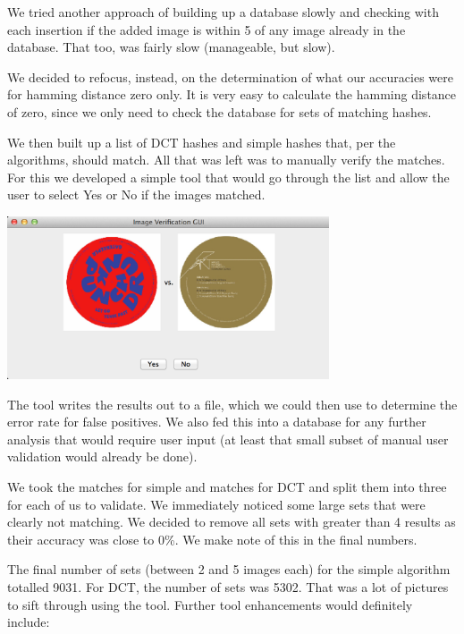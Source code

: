 \documentclass[11pt,a4paper,titlepage]{article}
\begin{document}
We tried another approach of building up a database slowly and checking with
each insertion if the added image is within 5 of any image already in the
database.  That too, was fairly slow (manageable, but slow).

We decided to refocus, instead, on the determination of what our accuracies
were for hamming distance zero only.  It is very easy to calculate the hamming
distance of zero, since we only need to check the database for sets of matching
hashes.

We then built up a list of DCT hashes and simple hashes that, per the
algorithms, should match.  All that was left was to manually verify the
matches.  For this we developed a simple tool that would go through the list
and allow the user to select Yes or No if the images matched.

\begin{minipage}{\linewidth}
    \centering
    \includegraphics[width=360px]{image_verify.png}
\end{minipage}

The tool writes the results out to a file, which we could then use to determine 
the error rate for false positives.  We also fed this into a database for any
further analysis that would require user input (at least that small subset of
manual user validation would already be done).

We took the matches for simple and matches for DCT and split them into three
for each of us to validate.  We immediately noticed some large sets that were
clearly not matching.  We decided to remove all sets with greater than 4
results as their accuracy was close to 0\%.  We make note of this in the final
numbers.

The final number of sets (between 2 and 5 images each) for the simple algorithm
totalled 9031.  For DCT, the number of sets was 5302.  That was a lot of
pictures to sift through using the tool.  Further tool enhancements would
definitely include:
\end{document}

